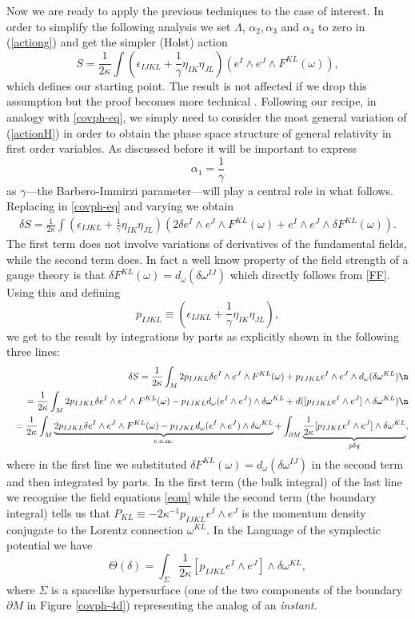 \documentclass[aps, nofootinbib,superscriptaddress,12pt]{revtex4-2}
\def\be{\begin{equation}}
\def\ee{\end{equation}}
\def\ba{\begin{eqnarray}}
\def\ea{\end{eqnarray}}
\begin{document}
Now we are ready to apply the previous techniques to the case of interest.
In order to simplify the following analysis we set $\Lambda$, $\alpha_2, \alpha_3$ and $\alpha_4$ to zero in (\ref{actiong}) and get the simpler (Holst) action 
\be\label{actionH}
S=\frac{1}{2 \kappa}\int (\epsilon_{IJKL}+\frac{1}{\gamma}\eta_{IK}\eta_{JL})  \left( e^I\wedge e^J\wedge F^{KL}(\omega)\right),
\ee
which defines our starting point.  The result is not affected if we drop this assumption but the proof becomes more technical \cite{Date:2008rb, Rezende:2009sv}. Following our recipe, in analogy with \eqref{covph-eq}, we simply need to consider the most general variation of (\ref{actionH}) in order to obtain the phase space structure of general relativity in first order variables. As discussed before it will be important to express
\be
\alpha_1=\frac{1}{\gamma}
\ee
as $\gamma$---the Barbero-Immirzi parameter---will play a central role in what follows.
Replacing in \eqref{covph-eq} and varying we obtain
\ba
\delta S=\frac{1}{2 \kappa}\int (\epsilon_{IJKL}+\frac{1}{\gamma}\eta_{IK}\eta_{JL})  \left(2\delta e^I\wedge e^J\wedge F^{KL}(\omega)+ e^I\wedge e^J\wedge \delta F^{KL}(\omega)\right).
\ea
The first term does not involve variations of derivatives of the fundamental fields, while the second term does. In fact a well know property of the field strength of a gauge theory is that $\delta F^{KL}(\omega)=d_{\omega} (\delta\omega^{IJ})$ which directly follows from \eqref{FF}.  Using this and defining 
\be
p_{IJKL}\equiv (\epsilon_{IJKL}+\frac{1}{\gamma}\eta_{IK}\eta_{JL}), 
\ee
we get to the result  by  integrations by parts as explicitly shown in the following three lines:
\ba
&& \delta S=\frac{1}{2 \kappa}\int_M 2 p_{IJKL} \delta e^I\wedge e^J\wedge F^{KL}(\omega)+  p_{IJKL}  e^I\wedge e^J\wedge d_{\omega}(\delta \omega^{KL})\n \\ && =\frac{1}{2 \kappa}\int_M 2p_{IJKL} \delta e^I\wedge e^J\wedge F^{KL}(\omega)-  p_{IJKL}  d_{\omega}(e^I\wedge e^J)\wedge \delta \omega^{KL}+d([p_{IJKL}  e^I\wedge e^J]\wedge \delta \omega^{KL})\n \\
&& =\frac{1}{2 \kappa}\int_M \underbrace{2p_{IJKL} \delta e^I\wedge e^J\wedge F^{KL}(\omega)-  p_{IJKL}  d_{\omega}(e^I\wedge e^J)\wedge \delta \omega^{KL}}_{\rm e.o.m.}+\int_{\partial M} \underbrace{\frac{1}{2 \kappa}[p_{IJKL}  e^I\wedge e^J]\wedge \delta \omega^{KL}}_{p\delta q},
\ea
where in the first line we substituted $\delta F^{KL}(\omega)=d_{\omega} (\delta\omega^{IJ})$ in the second term and then integrated by parts. In the first term (the bulk integral) of the last line we recognise the field equations \eqref{eom} while the second term (the boundary integral)  tells us that $P_{KL}\equiv -2 \kappa^{-1}p_{IJKL} e^I\wedge e^J$ is the momentum density conjugate to the Lorentz connection $\omega^{KL}$. In the Language of the symplectic potential we have
\be\label{sympo}
\Theta(\delta)=\int_{\Sigma} \frac{1}{2 \kappa}[p_{IJKL}  e^I\wedge e^J]\wedge \delta \omega^{KL},
\ee
where $\Sigma$ is a spacelike hypersurface (one of the two components of the boundary $\partial M$ in Figure \ref{covph-4d}) representing the analog of an {\em instant}.
\end{document}

